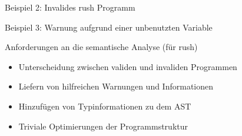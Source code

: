 \begin{frame}{Beispiel 2: Invalides rush Programm}
	\begin{minipage}{.5\textwidth}
	\end{minipage}%
	\begin{minipage}{.5\textwidth}
	\end{minipage}
\end{frame}

\begin{frame}{Beispiel 3: Warnung aufgrund einer unbenutzten Variable}
	\begin{minipage}{.5\textwidth}
	\end{minipage}%
	\begin{minipage}{.5\textwidth}
	\end{minipage}
\end{frame}

\begin{frame}{Anforderungen an die semantische Analyse (für rush)}
	\begin{itemize}
		\item Unterscheidung zwischen validen und invaliden Programmen
		\item Liefern von hilfreichen Warnungen und Informationen
		\item Hinzufügen von Typinformationen zu dem AST
		\item Triviale Optimierungen der Programmstruktur
	\end{itemize}
\end{frame}

